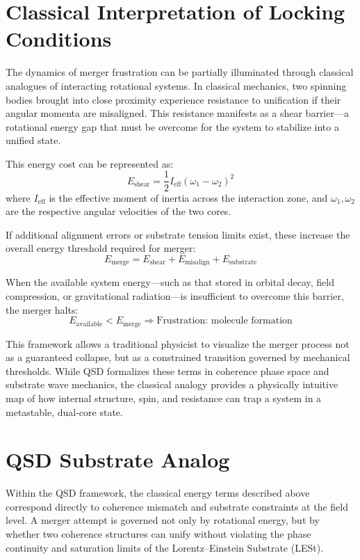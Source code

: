 \documentclass[sn-mathphys]{sn-jnl}
\theoremstyle{thmstyleone}%
\theoremstyle{thmstyletwo}%
\theoremstyle{thmstylethree}%
\begin{document}
\section{Classical Interpretation of Locking Conditions}

The dynamics of merger frustration can be partially illuminated through classical analogues of interacting rotational systems. In classical mechanics, two spinning bodies brought into close proximity experience resistance to unification if their angular momenta are misaligned. This resistance manifests as a shear barrier—a rotational energy gap that must be overcome for the system to stabilize into a unified state.

This energy cost can be represented as:
\[
E_{\text{shear}} = \frac{1}{2} I_{\text{eff}} (\omega_1 - \omega_2)^2
\]
where \( I_{\text{eff}} \) is the effective moment of inertia across the interaction zone, and \( \omega_1, \omega_2 \) are the respective angular velocities of the two cores.

If additional alignment errors or substrate tension limits exist, these increase the overall energy threshold required for merger:
\[
E_{\text{merge}} = E_{\text{shear}} + E_{\text{misalign}} + E_{\text{substrate}}
\]

When the available system energy—such as that stored in orbital decay, field compression, or gravitational radiation—is insufficient to overcome this barrier, the merger halts:
\[
E_{\text{available}} < E_{\text{merge}} \Rightarrow \text{Frustration: molecule formation}
\]

This framework allows a traditional physicist to visualize the merger process not as a guaranteed collapse, but as a constrained transition governed by mechanical thresholds. While QSD formalizes these terms in coherence phase space and substrate wave mechanics, the classical analogy provides a physically intuitive map of how internal structure, spin, and resistance can trap a system in a metastable, dual-core state.

\section{QSD Substrate Analog}

Within the QSD framework, the classical energy terms described above correspond directly to coherence mismatch and substrate constraints at the field level. A merger attempt is governed not only by rotational energy, but by whether two coherence structures can unify without violating the phase continuity and saturation limits of the Lorentz--Einstein Substrate (LESt).
\end{document}
